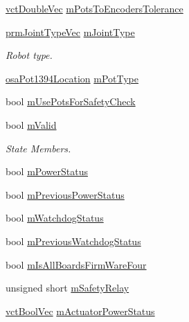\begin{DoxyCompactItemize}
\hyperlink{vct_dynamic_vector_types_8h_ade4b3068c86fb88f41af2e5187e491c2}{vct\+Double\+Vec} \hyperlink{classsaw_robot_i_o1394_1_1osa_robot1394_ae7403c87ba3f27f675f42469e8b1becd}{m\+Pots\+To\+Encoders\+Tolerance}
\item 
\hyperlink{prm_joint_type_8h_a3a21392b4484e2e24aa0b73d553f940e}{prm\+Joint\+Type\+Vec} \hyperlink{classsaw_robot_i_o1394_1_1osa_robot1394_af5829db2fe13eb37578e7bcafce7a3b7}{m\+Joint\+Type}
\begin{DoxyCompactList}\small\item\em Robot type. \end{DoxyCompactList}\item 
\hyperlink{namespacesaw_robot_i_o1394_a9d63d89648f679b6af5cf3f16576bde9}{osa\+Pot1394\+Location} \hyperlink{classsaw_robot_i_o1394_1_1osa_robot1394_a064754c253caef562e4c95429b0ae1ee}{m\+Pot\+Type}
\item 
bool \hyperlink{classsaw_robot_i_o1394_1_1osa_robot1394_a2aeda5f2dad4bc849117833d94dea2fd}{m\+Use\+Pots\+For\+Safety\+Check}
\item 
bool \hyperlink{classsaw_robot_i_o1394_1_1osa_robot1394_acc0bfb2da3fa7f77e29298984da615ec}{m\+Valid}
\begin{DoxyCompactList}\small\item\em State Members. \end{DoxyCompactList}\item 
bool \hyperlink{classsaw_robot_i_o1394_1_1osa_robot1394_aaccb154ac4cf5f274828bd3c8102c823}{m\+Power\+Status}
\item 
bool \hyperlink{classsaw_robot_i_o1394_1_1osa_robot1394_aa988f2c166a0f19e3600343057fef2d2}{m\+Previous\+Power\+Status}
\item 
bool \hyperlink{classsaw_robot_i_o1394_1_1osa_robot1394_a340e3e038049be9906f65234a7489aa3}{m\+Watchdog\+Status}
\item 
bool \hyperlink{classsaw_robot_i_o1394_1_1osa_robot1394_ab525fcd9abd100ef9a2574aaa4381ad5}{m\+Previous\+Watchdog\+Status}
\item 
bool \hyperlink{classsaw_robot_i_o1394_1_1osa_robot1394_ae0a5ea1b2b875284bd8c3e5df038c3e1}{m\+Is\+All\+Boards\+Firm\+Ware\+Four}
\item 
unsigned short \hyperlink{classsaw_robot_i_o1394_1_1osa_robot1394_a550d25317369e34ea8be9006e4494d83}{m\+Safety\+Relay}
\item 
\hyperlink{vct_dynamic_vector_types_8h_aeb2237c134aee3769198bd9d55c8a9e0}{vct\+Bool\+Vec} \hyperlink{classsaw_robot_i_o1394_1_1osa_robot1394_a05b12ee5d3989a36d9ce09cda53f0def}{m\+Actuator\+Power\+Status}

\end{DoxyCompactItemize}
